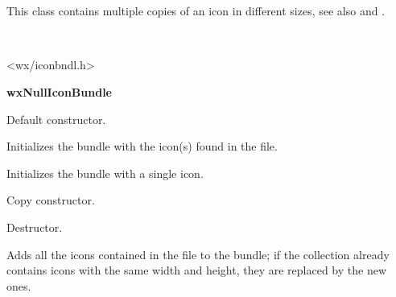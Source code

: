 \section{}\label{wxiconbundle}

This class contains multiple copies of an icon in different sizes,
see also  and
.


\\


<wx/iconbndl.h>


{\bf wxNullIconBundle}



\label{wxiconbundlewxiconbundle}


Default constructor.


Initializes the bundle with the icon(s) found in the file.


Initializes the bundle with a single icon.


Copy constructor.


\label{wxiconbundledtor}


Destructor.


\label{wxiconbundleaddicon}


Adds all the icons contained in the file to the bundle;
if the collection already contains icons with the same
width and height, they are replaced by the new ones.


